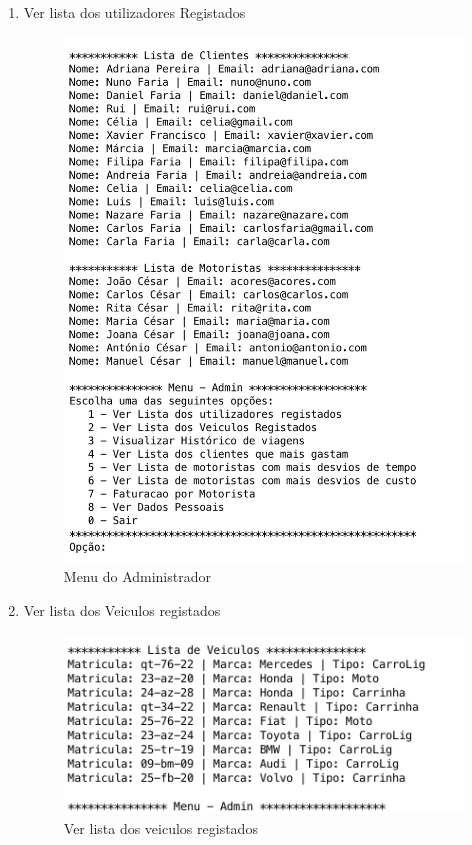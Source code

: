 \begin{enumerate}
	\item Ver lista dos utilizadores Registados
	\begin{figure}[htpb]
		\centering
		\includegraphics[scale=0.5]{imagem/verListaAtores}
		\caption{Menu do Administrador }
		\label{p3:fig:p3_verListaAtores}
	\end{figure}

\item Ver lista dos Veiculos registados 
	\begin{figure}[htpb]
	\centering
	\includegraphics[scale=0.5]{imagem/verListaVeiculos}
	\caption{Ver lista dos veiculos registados }
	\label{p3:fig:p3_verListaVeiculos}
\end{figure}


\end{enumerate}
